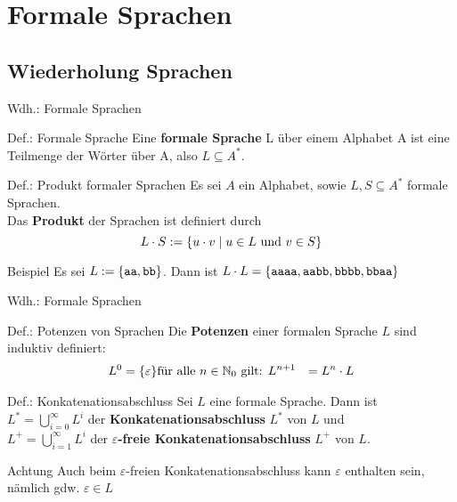 \section{Formale Sprachen}
\subsection{Wiederholung Sprachen} %
\begin{frame}{Wdh.: Formale Sprachen}
	\begin{block}{Def.: Formale Sprache}
		Eine \textbf{formale Sprache} L über einem Alphabet A ist eine Teilmenge der Wörter über A, also \(L \subseteq A^{*}\).
	\end{block}

	\begin{block}{Def.: Produkt formaler Sprachen}
		Es sei $A$ ein Alphabet, sowie $L,S \subseteq A^*$ formale Sprachen.\\
		Das \textbf{Produkt} der Sprachen ist definiert durch
		\[
			L \cdot S := \{ u \cdot v \mid u \in L \text{ und } v \in S \}
		\]
	\end{block}

	\begin{exampleblock}{Beispiel}
		Es sei $L:=\{ \texttt{aa}, \texttt{bb} \}$. Dann ist $L\cdot L = \{ \texttt{aaaa}, \texttt{aabb}, \texttt{bbbb}, \texttt{bbaa} \}$
	\end{exampleblock}
\end{frame}

\begin{frame}{Wdh.: Formale Sprachen}
	\begin{block}{Def.: Potenzen von Sprachen}
		Die \textbf{Potenzen} einer formalen Sprache $L$ sind induktiv definiert:
		\begin{align*}
			L^0 &= \{ \varepsilon \}
			\text{für alle $n \in \mathbb{N}_0$ gilt: } L^{n+1} &= L^n \cdot L
		\end{align*}
	\end{block}

	\begin{block}{Def.: Konkatenationsabschluss}
		Sei $L$ eine formale Sprache. Dann ist \\
		$L^* = \bigcup_{i=0}^{\infty} L^{i}$ der \textbf{Konkatenationsabschluss} $L^*$ von $L$ und \\
		$L^+ = \bigcup_{i=1}^{\infty} L^{i}$ der \textbf{$\varepsilon$-freie Konkatenationsabschluss} $L^+$ von $L$.
	\end{block}

	\begin{alertblock}{Achtung}
		Auch beim $\varepsilon$-freien Konkatenationsabschluss kann $\varepsilon$ enthalten sein, nämlich gdw. $\varepsilon \in L$
	\end{alertblock}
\end{frame}



